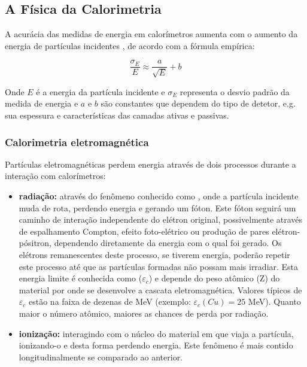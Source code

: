 \subsection{A Física da Calorimetria}

A acurácia das medidas de energia em calorímetros aumenta com o aumento da
energia de partículas incidentes \cite{hadcal}, de acordo com a fórmula
empírica:

\begin{equation}
  \frac{\sigma_{E}}{E} \approx \frac{a}{\sqrt{E}} + b
\end{equation}

Onde $E$ é a energia da partícula incidente e $\sigma_{E}$ representa o desvio
padrão da medida de energia e $a$ e $b$ são constantes que dependem do tipo de
detetor, e.g. sua espessura e características das camadas ativas e passivas.

\subsubsection{Calorimetria eletromagnética}

Partículas eletromagnéticas perdem energia através de dois processos durante a
interação com calorímetros:

\begin{itemize}
\item {\bf radiação:} através do fenômeno conhecido como
  , onde a partícula incidente muda de rota, perdendo
  energia e gerando um fóton. Este fóton seguirá um caminho de interação
  independente do elétron original, possivelmente através de espalhamento
  Compton, efeito foto-elétrico ou produção de pares elétron-pósitron,
  dependendo diretamente da energia com o qual foi gerado. Os elétrons
  remanescentes deste processo, se tiverem energia, poderão repetir este
  processo até que as partículas formadas não possam mais irradiar. Esta
  energia limite é conhecida como  ($\varepsilon_{c}$) e
  depende do peso atômico (Z) do material por onde se desenvolve a cascata
  eletromagnética. Valores típicos de $\varepsilon_{c}$ estão na faixa de
  dezenas de MeV (exemplo: $\varepsilon_{c}(Cu) = 25$ MeV). Quanto maior o
  número atômico, maiores as chances de perda por radiação\cite{knoll, leo}.

\item {\bf ionização:} interagindo com o núcleo do material em que viaja a
  partícula, ionizando-o e desta forma perdendo energia. Este fenômeno é mais
  contido longitudinalmente se comparado ao anterior.
\end{itemize}

